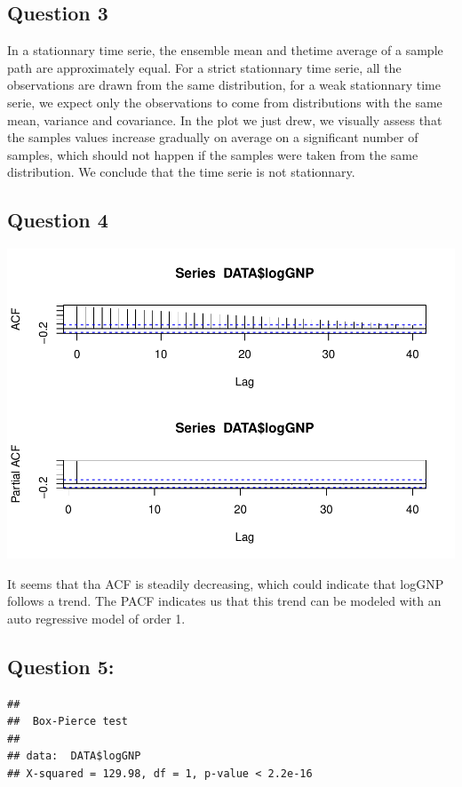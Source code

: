 \documentclass[]{article}
\begin{document}
\subsection{Question 3}\label{question-3}

In a stationnary time serie, the ensemble mean and thetime average of a
sample path are approximately equal. For a strict stationnary time
serie, all the observations are drawn from the same distribution, for a
weak stationnary time serie, we expect only the observations to come
from distributions with the same mean, variance and covariance. In the
plot we just drew, we visually assess that the samples values increase
gradually on average on a significant number of samples, which should
not happen if the samples were taken from the same distribution. We
conclude that the time serie is not stationnary.

\subsection{Question 4}\label{question-4}

\includegraphics{TP6_Analysis_Dejous_files/figure-latex/unnamed-chunk-2-1.pdf}

It seems that tha ACF is steadily decreasing, which could indicate that
logGNP follows a trend. The PACF indicates us that this trend can be
modeled with an auto regressive model of order 1.

\subsection{Question 5:}\label{question-5}

\begin{verbatim}
## 
##  Box-Pierce test
## 
## data:  DATA$logGNP
## X-squared = 129.98, df = 1, p-value < 2.2e-16
\end{verbatim}
\end{document}
